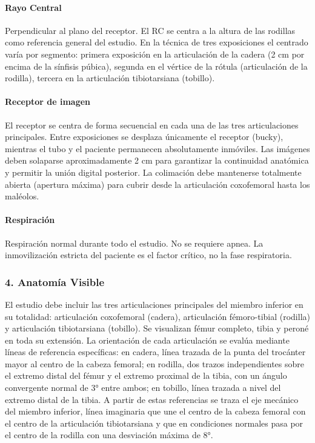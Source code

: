 	\paragraph{Rayo Central}
	Perpendicular al plano del receptor. El RC se centra a la altura de las rodillas como referencia general del estudio. En la técnica de tres exposiciones el centrado varía por segmento: primera exposición en la articulación de la cadera (2 cm por encima de la sínfisis púbica), segunda en el vértice de la rótula (articulación de la rodilla), tercera en la articulación tibiotarsiana (tobillo).
	
	\paragraph{Receptor de imagen}
	El receptor se centra de forma secuencial en cada una de las tres articulaciones principales. Entre exposiciones se desplaza únicamente el receptor (bucky), mientras el tubo y el paciente permanecen absolutamente inmóviles. Las imágenes deben solaparse aproximadamente 2 cm para garantizar la continuidad anatómica y permitir la unión digital posterior. La colimación debe mantenerse totalmente abierta (apertura máxima) para cubrir desde la articulación coxofemoral hasta los maléolos.
	

	
	\paragraph{Respiración}
	Respiración normal durante todo el estudio. No se requiere apnea. La inmovilización estricta del paciente es el factor crítico, no la fase respiratoria.
	
	\subsubsection*{4. Anatomía Visible}
	
	El estudio debe incluir las tres articulaciones principales del miembro inferior en su totalidad: articulación coxofemoral (cadera), articulación fémoro-tibial (rodilla) y articulación tibiotarsiana (tobillo). Se visualizan fémur completo, tibia y peroné en toda su extensión. La orientación de cada articulación se evalúa mediante líneas de referencia específicas: en cadera, línea trazada de la punta del trocánter mayor al centro de la cabeza femoral; en rodilla, dos trazos independientes sobre el extremo distal del fémur y el extremo proximal de la tibia, con un ángulo convergente normal de 3° entre ambos; en tobillo, línea trazada a nivel del extremo distal de la tibia. A partir de estas referencias se traza el eje mecánico del miembro inferior, línea imaginaria que une el centro de la cabeza femoral con el centro de la articulación tibiotarsiana y que en condiciones normales pasa por el centro de la rodilla con una desviación máxima de 8°.
	
